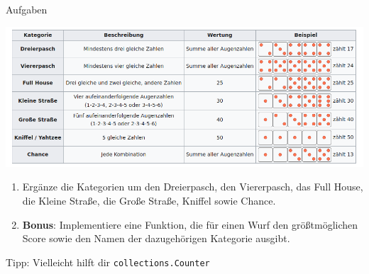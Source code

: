 \begin{frame}[fragile]{Aufgaben}
    \begin{center}
        \includegraphics[width=.9\textwidth]{Kniffel_Tabelle_2.png}
    \end{center}
    \begin{enumerate}
        \item Ergänze die Kategorien um den Dreierpasch, den Viererpasch, das Full House, die Kleine Straße, die Große Straße, Kniffel sowie Chance.
        \item \textbf{Bonus}: Implementiere eine Funktion, die für einen Wurf den größtmöglichen Score sowie den Namen der dazugehörigen Kategorie ausgibt.
    \end{enumerate}
    Tipp: Vielleicht hilft dir \texttt{collections.Counter}
\end{frame}


